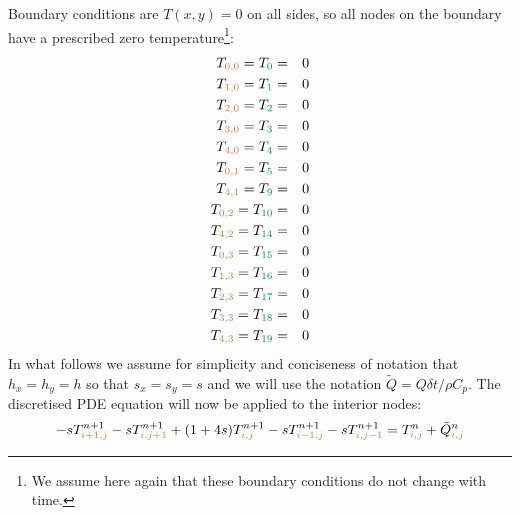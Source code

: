 Boundary conditions are $T(x,y)=0$ on all sides, so all nodes 
on the boundary have a prescribed zero temperature\footnote{We assume
here again that these boundary conditions do not change with time.}:
\begin{eqnarray}
T_{\color{brown}0,0} = T_{\color{teal} 0} &=& 0 \nonumber\\
T_{\color{brown}1,0} = T_{\color{teal} 1} &=& 0 \nonumber\\
T_{\color{brown}2,0} = T_{\color{teal} 2} &=& 0 \nonumber\\
T_{\color{brown}3,0} = T_{\color{teal} 3} &=& 0 \nonumber\\
T_{\color{brown}4,0} = T_{\color{teal} 4} &=& 0 \nonumber\\
T_{\color{brown}0,1} = T_{\color{teal} 5} &=& 0 \nonumber\\
T_{\color{brown}4,1} = T_{\color{teal} 9} &=& 0 \nonumber\\
T_{\color{brown}0,2} = T_{\color{teal} 10} &=& 0 \nonumber\\
T_{\color{brown}4,2} = T_{\color{teal} 14} &=& 0 \nonumber\\
T_{\color{brown}0,3} = T_{\color{teal} 15} &=& 0 \nonumber\\
T_{\color{brown}1,3} = T_{\color{teal} 16} &=& 0 \nonumber\\
T_{\color{brown}2,3} = T_{\color{teal} 17} &=& 0 \nonumber\\
T_{\color{brown}3,3} = T_{\color{teal} 18} &=& 0 \nonumber\\
T_{\color{brown}4,3} = T_{\color{teal} 19} &=& 0 \nonumber
\end{eqnarray}
In what follows we assume for simplicity and conciseness of notation that 
$h_x=h_y=h$ so that $s_x=s_y=s$ and we will use the notation $\tilde{Q}=Q \delta t/\rho C_p$.
The discretised PDE equation will now be applied to the interior nodes:
\begin{eqnarray}
-s T_{{\color{brown} i+1,j}}^{n+1}
-s T_{{\color{brown}i,j+1}}^{n+1} 
+(1+4s)T_{{\color{brown}i,j}}^{n+1} 
-s T_{{\color{brown}i-1,j}}^{n+1} 
-s T_{{\color{brown}i,j-1}}^{n+1} 
= T_{{\color{brown}i,j}}^n 
+\tilde{Q}_{{\color{brown}i,j}}^n
\end{eqnarray}


